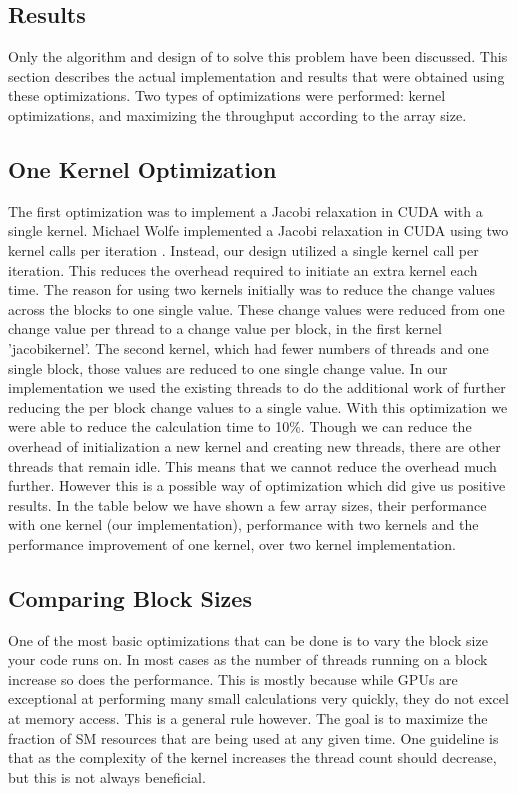 \documentclass[10pt]{article}
\begin{document}
\begin{multicols}{2}
  \section{Results} %
  Only the algorithm and design of to solve this problem have been discussed.
  This section describes the actual implementation and results that were obtained using these optimizations.
  Two types of optimizations were performed: kernel optimizations, and maximizing the throughput according to the array size.
  \subsection{One Kernel Optimization}
  The first optimization was to implement a Jacobi relaxation in CUDA with a single kernel.
  Michael Wolfe implemented a Jacobi relaxation in CUDA using two kernel calls per iteration \cite{michael}.
  Instead, our design utilized a single kernel call per iteration.
  This reduces the overhead required to initiate an extra kernel each time.
  The reason for using two kernels initially was to reduce the change values across the blocks to one single value.
  These change values were reduced from one change value per thread to a change value per block, in the first kernel 'jacobikernel'.
  The second kernel, which had fewer numbers of threads and one single block, those values are reduced to one single change value.
  In our implementation we used the existing threads to do the additional work of further reducing the per block change values to a single value.
  With this optimization we were able to reduce the calculation time to 10\%.
  Though we can reduce the overhead of initialization a new kernel and creating new threads, there are other threads that remain idle.
  This means that we cannot reduce the overhead much further.
  However this is a possible way of optimization which did give us positive results.
  In the table below we have shown a few array sizes, their performance with one kernel (our implementation), performance with two kernels \cite{michael} and the performance improvement of one kernel, over two kernel implementation.

  \subsection{Comparing Block Sizes}
  One of the most basic optimizations that can be done is to vary the block size your code runs on.
  In most cases as the number of threads running on a block increase so does the performance.
  This is mostly because while GPUs are exceptional at performing many small calculations very quickly, they do not excel at memory access.
  This is a general rule however.
  The goal is to maximize the fraction of SM resources that are being used at any given time.
  One guideline is that as the complexity of the kernel increases the thread count should decrease, but this is not always beneficial.


\end{multicols}
\end{document}
